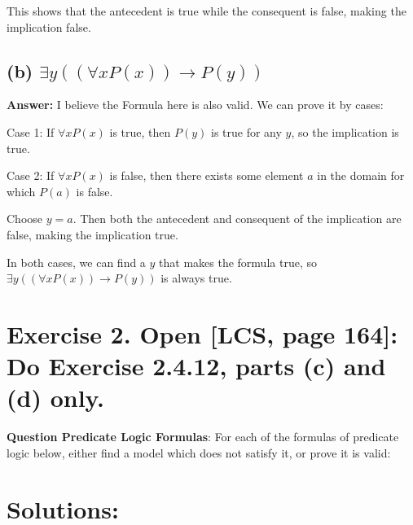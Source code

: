 \documentclass{article}
\begin{document}
This shows that the antecedent is true while the consequent is false, making the implication false.
\vspace{1em}


\newpage

\subsection*{(b) $\exists y ((\forall x P(x)) \rightarrow P(y))$}

\vspace{1em}
\textbf{Answer:} I believe the Formula here is also valid. We can prove it by cases:

\vspace{1em}
Case 1: If $\forall x P(x)$ is true, then $P(y)$ is true for any $y$, so the implication is true.

\vspace{1em}
Case 2: If $\forall x P(x)$ is false, then there exists some element $a$ in the domain for which $P(a)$ is false. 

\vspace{1em}
Choose $y = a$. Then both the antecedent and consequent of the implication are false, making the implication true.

\vspace{1em}
In both cases, we can find a $y$ that makes the formula true, so $\exists y ((\forall x P(x)) \rightarrow P(y))$ is always true.


\newpage


\section*{Exercise 2. Open [LCS, page 164]: Do Exercise 2.4.12, parts (c) and (d) only.}

\begin{mdframed}
    \vspace{1em}
        \textbf{Question Predicate Logic Formulas}: For each of the formulas of predicate logic below, either find a model which
        does not satisfy it, or prove it is valid:
    \vspace{1em}
    \end{mdframed}
    
\section*{Solutions: }

\vspace{1em}
\end{document}
